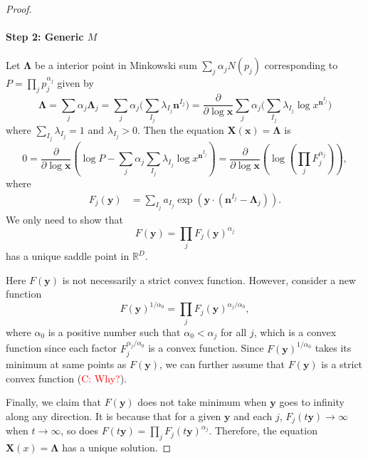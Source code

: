 \documentclass[12pt]{article}
\theoremstyle{definition}
\theoremstyle{plain}
\begin{document}
\begin{proof}
	\paragraph{Step 2: Generic $M$} Let $\mathbf{\Lambda}$ be a interior point in Minkowski sum $\sum_j \alpha_j N(p_{j})$ corresponding to $P=\prod_j p_{j}^{\alpha_{j}}$ given by 
	\[
		\mathbf{\Lambda}
		=\sum_j \alpha_j \mathbf{\Lambda}_j
		=\sum_j \alpha_{j} \biggl(\sum_{I_j}\lambda_{I_j}\mathbf{n}^{I_j}\biggr)
		=\frac{\partial}{\partial \log \mathbf{x}}\sum_{j}\alpha_j\biggl( \sum_{I_j}\lambda_{I_j} \log x^{\mathbf n^{I_j}}\biggr)
	\]
	where $\sum_{I_j} \lambda_{I_j}=1$ and $\lambda_{I_j} > 0$. Then the equation $\mathbf{X}(\mathbf{x})=\mathbf{\Lambda}$ is 
	\[
		0=\frac{\partial }{\partial \log \mathbf{x}}\left(
			\log P-\sum_{j}\alpha_j\sum_{I_j}\lambda_{I_j} \log x^{\mathbf n^{I_j}}
		\right)=\frac{\partial }{\partial \log \mathbf{x}}\left(
		\log \left(\prod_j F_{j}^{\alpha_{j}}\right)
		\right),
	\]
	where
	\[
		\begin{aligned}
			F_j(\mathbf y)&=\sum_{I_{j}} a_{I_{j}} \exp\left(\mathbf{y}\cdot \left(\mathbf{n}^{I_j}-\mathbf{\Lambda}_j\right)\right).
		\end{aligned}
	\]	
	We only need to show that
	\[
		F(\mathbf y)=\prod_j F_j(\mathbf{y})^{\alpha_j}	
	\]
	has a unique saddle point in $\mathds{R}^D$.
	
	Here $F(\mathbf y)$ is not necessarily a strict convex function. However, consider a new function
	\[
		F(\mathbf y)^{1/\alpha_0}=\prod_j F_j(\mathbf y)^{\alpha_j/\alpha_0},
	\]
	where $\alpha_0$ is a positive number such that $\alpha_0< \alpha_j$ for all $j$, which is a convex function 
	since each factor $F_{j}^{\alpha_{j}/\alpha_{0}}$ is a convex function. Since $F(\mathbf y)^{1/\alpha_0}$ takes its minimum at same points as $F(\mathbf y)$, 
	we can further assume that $F(\mathbf y)$ is a strict convex function (\textcolor{red}{C: Why?}). 
	
	Finally, we claim that $F(\mathbf y)$ does not take minimum when $\mathbf{y}$ goes to infinity 
	along any direction. It is because that for a given $\mathbf{y}$ and each $j$, $F_j(t\mathbf{y})\to \infty$ when $t\to \infty$,
	so does $F(t\mathbf{y})=\prod_j F_j(t\mathbf{y})^{\alpha_j}$. Therefore, the equation $\mathbf{X}(x)=\mathbf{\Lambda}$ has a unique solution.
	\end{proof}
	












\end{document}
